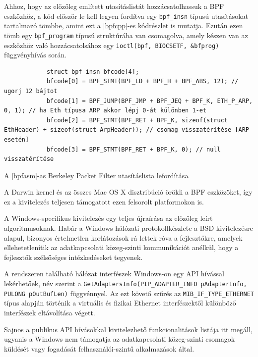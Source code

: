 \documentclass[a4paper,12pt]{article}
\newcounter{subsubsubsection}[subsubsection]
\begin{document}
	Ahhoz, hogy az előzőleg említett utasításlistát hozzácsatolhassuk a BPF eszközhöz, a kód először le kell legyen fordítva egy \texttt{bpf_insn} típusú utasításokat tartalmazó tömbbe, amint ezt a \ref{bpfcpp}-es kódrészlet is mutatja. Ezután ezen tömb egy \texttt{bpf_program} típusú struktúrába van csomagolva, amely készen van az eszközhöz való hozzácsatolsához egy \texttt{ioctl(bpf, BIOCSETF, &bfprog)} függvényhívás során.
	
	\begin{listing}[H]
		\begin{verbatim}
			struct bpf_insn bfcode[4];
			bfcode[0] = BPF_STMT(BPF_LD + BPF_H + BPF_ABS, 12); // ugorj 12 bájtot
			bfcode[1] = BPF_JUMP(BPF_JMP + BPF_JEQ + BPF_K, ETH_P_ARP, 0, 1); // ha Eth típusa ARP akkor lépj 0-át különben 1-et
			bfcode[2] = BPF_STMT(BPF_RET + BPF_K, sizeof(struct EthHeader) + sizeof(struct ArpHeader)); // csomag visszatérítése [ARP esetén]
			bfcode[3] = BPF_STMT(BPF_RET + BPF_K, 0); // null visszatérítése
		\end{verbatim}
		\caption{A \ref{bpfasm}-as Berkeley Packet Filter utasításlista lefordítása}
		\label{bpfcpp}
	\end{listing}
	
	A Darwin kernel és az összes Mac OS X disztribúció örökli a BPF eszközöket, így ez a kivitelezés teljesen támogatott ezen felsorolt platformokon is.


	A Windows-specifikus kivitelezés egy teljes újraírása az előzőleg leírt algoritmusoknak. Habár a Windows hálózati protokollkészlete a BSD kivitelezésre alapul, bizonyos értelmetlen korlátozások rá lettek róva a fejlesztőkre, amelyek ellehetetlenítik az adatkapcsolati közeg-szinti kommunikációt anélkül, hogy a fejlesztők szélsőséges intézkedéseket tegyenek.
	
	A rendszeren található hálózat interfészek Windows-on egy API hívással lekérhetőek, név szerint a \texttt{GetAdaptersInfo(PIP_ADAPTER_INFO pAdapterInfo, PULONG pOutBufLen)} függvénnyel. Az ezt követő szűrés az \texttt{MIB_IF_TYPE_ETHERNET} típus alapján történik a virtuális és fizikai Ethernet interfészektől különböző interfészek eltávolítása végett.
	
	Sajnos a publikus API hívásokkal kivitelezhető funkcionalitások listája itt megáll, ugyanis a Windows nem támogatja az adatkapcsolati közeg-szinti csomagok küldését vagy fogadását felhasználói-szintű alkalmazások által.
	
\end{document}
